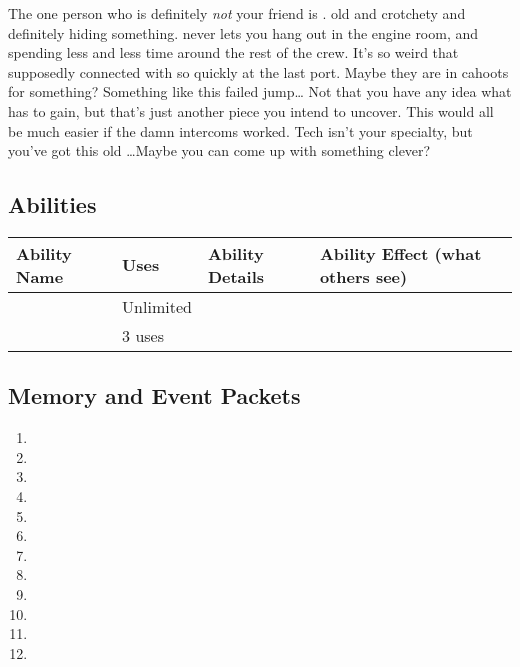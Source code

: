 \documentclass[char]{TMFHope}
\begin{document}
The one person who is definitely \emph{not} your friend is \cEng{\full}. \cEng{\They} \cEng{\are} old and crotchety and definitely hiding something. \cEng{} never lets you hang out in the engine room, and \cEng{\they} \cEng{\are} spending less and less time around the rest of the crew. It's so weird that \cEng{\they} supposedly connected with \cBoy{} so quickly at the last port. Maybe they are in cahoots for something? Something like this failed jump\ldots{} Not that you have any idea what \cEng{} has to gain, but that's just another piece you intend to uncover. This would all be much easier if the damn intercoms worked. Tech isn't your specialty, but you've got this old \iWT{}\ldots Maybe you can come up with something clever?

\subsection*{Abilities}
\begin{tabular}{|p{3cm}|p{1.5cm}|p{6.5cm}|p{5cm}|} 
 \hline
 \textbf{Ability Name} & \textbf{Uses} & \textbf{Ability Details} & \textbf{Ability Effect (what others see)} \\ 
\hline 
 \aThreat{\MYname} & Unlimited & \aThreat{\MYtext} & \aThreat{\MYeffect} \\ 
\hline
 \aFirstAid{\MYname} & 3 uses & \aFirstAid{\MYtext} & \aFirstAid{\MYeffect}\\ 
 \hline
\end{tabular}

\subsection*{Memory and Event Packets}
\begin{enumerate}
	\item \mPractice{\MYname}
	\item \mWAlpha{\MYname}
	\item \mWeaponsOne{\MYname}
	\item \mWeaponsTwo{\MYname}
	\item \mWeaponsThree{\MYname}
	\item \mBroom{\MYname}
	\item \mLab{\Myname}
	\item \mPatient{\MYname}
	\item \mKitchen{\MYname}
	\item \mWeight{\MYname}
	\item \mTheater{\MYname}
	\item \mCrates{\MYname}
\end{enumerate}
\end{document}
